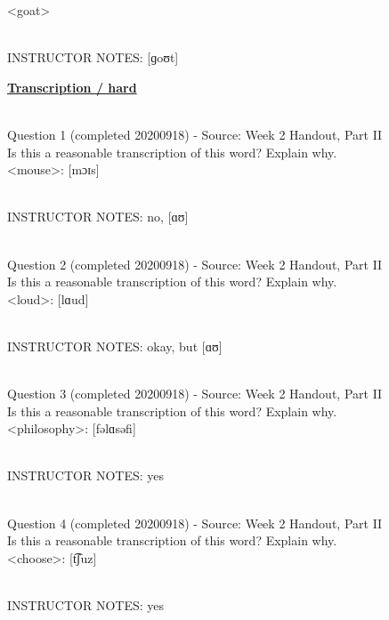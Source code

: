 \documentclass[12pt]{article}
\begin{document}
<goat>


~\\
INSTRUCTOR NOTES: [ɡoʊt]


\newpage\textbf{\underline{\huge Transcription / hard\\}}

~\\

{\large Question 1} (completed 20200918) - Source: Week 2 Handout, Part II\\

Is this a reasonable transcription of this word? Explain why.\\

<mouse>: {[mɔɪs]}


~\\
INSTRUCTOR NOTES: no, [ɑʊ]


~\\

{\large Question 2} (completed 20200918) - Source: Week 2 Handout, Part II\\

Is this a reasonable transcription of this word? Explain why.\\

<loud>: {[lɑud]}


~\\
INSTRUCTOR NOTES: okay, but [ɑʊ]


~\\

{\large Question 3} (completed 20200918) - Source: Week 2 Handout, Part II\\

Is this a reasonable transcription of this word? Explain why.\\

<philosophy>: {[fəlɑsəfi]}


~\\
INSTRUCTOR NOTES: yes


~\\

{\large Question 4} (completed 20200918) - Source: Week 2 Handout, Part II\\

Is this a reasonable transcription of this word? Explain why.\\

<choose>: {[t͡ʃuz]}


~\\
INSTRUCTOR NOTES: yes


~\\
\end{document}

